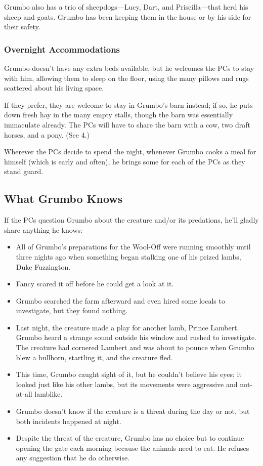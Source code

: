 \documentclass[10pt,a4paper,twoside,bg=print,twocolumn,openany,nodeprecatedcode]{dndbook}
\begin{document}
Grumbo also has a trio of sheepdogs—Lucy, Dart, and Priscilla—that herd his sheep and goats. Grumbo has been keeping them in the house or by his side for their safety.

\subsubsection{Overnight Accommodations}
Grumbo doesn't have any extra beds available, but he welcomes the PCs to stay with him, allowing them to sleep on the floor, using the many pillows and rugs scattered about his living space.

If they prefer, they are welcome to stay in Grumbo's barn instead; if so, he puts down fresh hay in the many empty stalls, though the barn was essentially immaculate already. The PCs will have to share the barn with a cow, two draft horses, and a pony. (See 4.)

Wherever the PCs decide to spend the night, whenever Grumbo cooks a meal for himself (which is early and often), he brings some for each of the PCs as they stand guard.

\subsection{What Grumbo Knows}
If the PCs question Grumbo about the creature and/or its predations, he'll gladly share anything he knows:


\begin{itemize}
\item All of Grumbo's preparations for the Wool-Off were running smoothly until three nights ago when something began stalking one of his prized lambs, Duke Fuzzington.
\item Fancy scared it off before he could get a look at it.
\item Grumbo searched the farm afterward and even hired some locals to investigate, but they found nothing.
\item Last night, the creature made a play for another lamb, Prince Lambert. Grumbo heard a strange sound outside his window and rushed to investigate. The creature had cornered Lambert and was about to pounce when Grumbo blew a bullhorn, startling it, and the creature fled.
\item This time, Grumbo caught sight of it, but he couldn't believe his eyes; it looked just like his other lambs, but its movements were aggressive and not-at-all lamblike.
\item Grumbo doesn't know if the creature is a threat during the day or not, but both incidents happened at night.
\item Despite the threat of the creature, Grumbo has no choice but to continue opening the gate each morning because the animals need to eat. He refuses any suggestion that he do otherwise.
\end{itemize}
\end{document}
